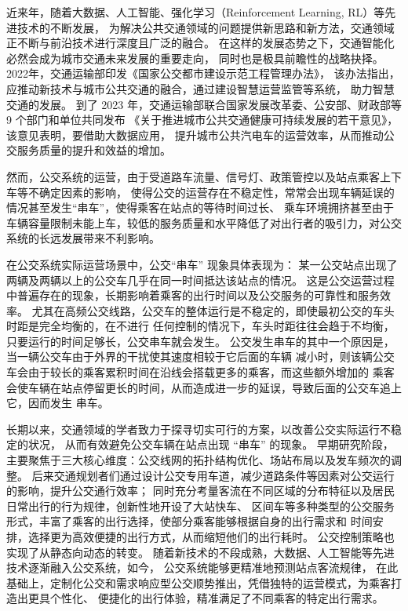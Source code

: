 近来年，随着大数据、人工智能、强化学习（Reinforcement Learning, RL）等先进技术的不断发展，
为解决公共交通领域的问题提供新思路和新方法，交通领域正不断与前沿技术进行深度且广泛的融合。
在这样的发展态势之下，交通智能化必然会成为城市交通未来发展的重要走向，
同时也是极具前瞻性的战略抉择。
2022年，交通运输部印发《国家公交都市建设示范工程管理办法》\cite {__2022}，
该办法指出，应推动新技术与城市公共交通的融合，通过建设智慧运营监管等系统，
助力智慧交通的发展。
到了 2023 年，交通运输部联合国家发展改革委、公安部、财政部等 9 个部门和单位共同发布
《关于推进城市公共交通健康可持续发展的若干意见》\cite {__2023}，该意见表明，要借助大数据应用，
提升城市公共汽电车的运营效率，从而推动公交服务质量的提升和效益的增加。

然而，公交系统的运营，由于受道路车流量、信号灯、政策管控以及站点乘客上下车等不确定因素的影响，
使得公交的运营存在不稳定性，常常会出现车辆延误的情况甚至发生“串车”，使得乘客在站点的等待时间过长、
乘车环境拥挤甚至由于车辆容量限制未能上车，较低的服务质量和水平降低了对出行者的吸引力，对公交
系统的长远发展带来不利影响。

在公交系统实际运营场景中，公交“串车” 现象具体表现为：
某一公交站点出现了两辆及两辆以上的公交车几乎在同一时间抵达该站点的情况。
这是公交运营过程中普遍存在的现象，长期影响着乘客的出行时间以及公交服务的可靠性和服务效率。
尤其在高频公交线路，公交车的整体运行是不稳定的，即使最初公交的车头时距是完全均衡的，在不进行
任何控制的情况下，车头时距往往会趋于不均衡，只要运行的时间足够长，公交串车就会发生。
公交发生串车的其中一个原因是，当一辆公交车由于外界的干扰使其速度相较于它后面的车辆
减小时，则该辆公交车会由于较长的乘客累积时间在沿线会搭载更多的乘客，而这些额外增加的
乘客会使车辆在站点停留更长的时间，从而造成进一步的延误，导致后面的公交车追上它，因而发生
串车\cite{Newell1964}。

长期以来，交通领域的学者致力于探寻切实可行的方案，以改善公交实际运行不稳定的状况，
从而有效避免公交车辆在站点出现 “串车” 的现象。
早期研究阶段，主要聚焦于三大核心维度：公交线网的拓扑结构优化、场站布局以及发车频次的调整。
后来交通规划者们通过设计公交专用车道，减少道路条件等因素对公交运行的影响，提升公交通行效率；
同时充分考量客流在不同区域的分布特征以及居民日常出行的行为规律，创新性地开设了大站快车、
区间车等多种类型的公交服务形式，丰富了乘客的出行选择，使部分乘客能够根据自身的出行需求和
时间安排，选择更为高效便捷的出行方式，从而缩短他们的出行耗时。
公交控制策略也实现了从静态向动态的转变。
随着新技术的不段成熟，大数据、人工智能等先进技术逐渐融入公交系统，如今，
公交系统能够更精准地预测站点客流规律，
在此基础上，定制化公交和需求响应型公交顺势推出，凭借独特的运营模式，为乘客打造出更具个性化、
便捷化的出行体验，精准满足了不同乘客的特定出行需求。

